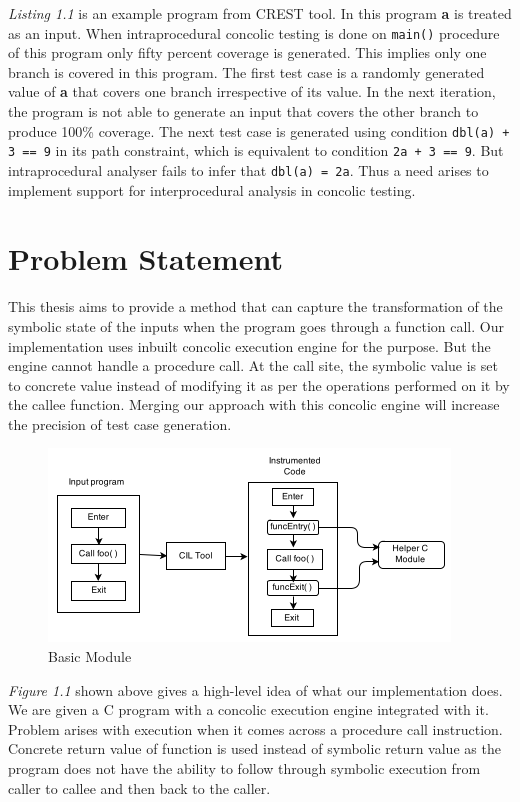 \documentclass[12pt,oneside]{book}
\begin{document}
\textit{Listing 1.1} is an example program from CREST\cite{crest} tool. In this program \textbf{a} is treated as an input. When intraprocedural concolic testing is done on \texttt{main()} procedure of this program only fifty percent coverage is generated. This implies only one branch is covered in this program. The first test case is a randomly generated value of \textbf{a} that covers one branch irrespective of its value. In the next iteration, the program is not able to generate an input that covers the other branch to produce 100\% coverage. The next test case is generated using condition \texttt{dbl(a) + 3 == 9} in its path constraint, which is equivalent to condition \texttt{2a + 3 == 9}. But intraprocedural analyser fails to infer that \texttt{dbl(a) = 2a}. Thus a need arises to implement support for interprocedural analysis in concolic testing.      


\section{Problem Statement}
This thesis aims to provide a method that can capture the transformation of the symbolic state of the inputs when the program goes through a function call. Our implementation uses inbuilt concolic execution engine\cite{concolicEngine} for the purpose. But the engine cannot handle a procedure call. At the call site, the symbolic value is set to concrete value instead of modifying it as per the operations performed on it by the callee function. Merging our approach with this concolic engine will increase the precision of test case generation. 

\begin{figure}[htbp]
\centering
\includegraphics[scale=1]{module3.png}
\caption{Basic Module}
\end{figure}

\textit{Figure 1.1} shown above gives a high-level idea of what our implementation does. We are given a C program with a concolic execution engine integrated with it. Problem arises with execution when it comes across a procedure call instruction. Concrete return value of function is used instead of symbolic return value as the program does not have the ability to follow through symbolic execution from caller to callee and then back to the caller.
\end{document}
